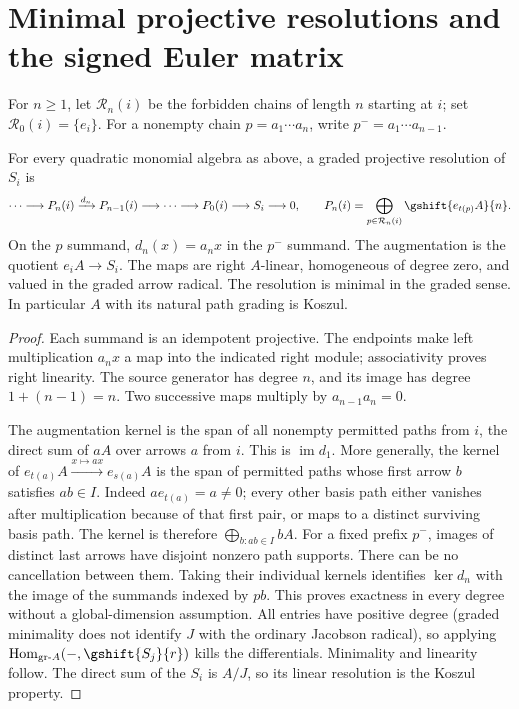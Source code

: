 \section{Minimal projective resolutions and the signed Euler matrix}
For $n\geq1$, let $\mathcal R_n(i)$ be the forbidden chains of length $n$ starting at $i$; set $\mathcal R_0(i)=\{e_i\}$. For a nonempty chain $p=a_1\cdots a_n$, write $p^-=a_1\cdots a_{n-1}$.
\begin{theorem}\label{thm:resolution}
For every quadratic monomial algebra as above, a graded projective resolution of $S_i$ is
\[
 \cdots\longrightarrow P_n(i)\xrightarrow{d_n}P_{n-1}(i)
 \longrightarrow\cdots\longrightarrow P_0(i)\longrightarrow S_i\longrightarrow0,
 \qquad P_n(i)=\bigoplus_{p\in\mathcal R_n(i)} \gshift{e_{t(p)}A}{n}.
\]
On the $p$ summand, $d_n(x)=a_nx$ in the $p^-$ summand. The augmentation is the quotient $e_iA\to S_i$. The maps are right $A$-linear, homogeneous of degree zero, and valued in the graded arrow radical. The resolution is minimal in the graded sense. In particular $A$ with its natural path grading is Koszul.
\end{theorem}
\begin{proof}
Each summand is an idempotent projective. The endpoints make left multiplication $a_nx$ a map into the indicated right module; associativity proves right linearity. The source generator has degree $n$, and its image has degree $1+(n-1)=n$. Two successive maps multiply by $a_{n-1}a_n=0$.

The augmentation kernel is the span of all nonempty permitted paths from $i$, the direct sum of $aA$ over arrows $a$ from $i$. This is $\operatorname{im}d_1$. More generally, the kernel of $e_{t(a)}A\xrightarrow{x\mapsto ax}e_{s(a)}A$ is the span of permitted paths whose first arrow $b$ satisfies $ab\in I$. Indeed $ae_{t(a)}=a\ne0$; every other basis path either vanishes after multiplication because of that first pair, or maps to a distinct surviving basis path. The kernel is therefore $\bigoplus_{b:ab\in I}bA$. For a fixed prefix $p^-$, images of distinct last arrows have disjoint nonzero path supports. There can be no cancellation between them. Taking their individual kernels identifies $\ker d_n$ with the image of the summands indexed by $pb$. This proves exactness in every degree without a global-dimension assumption. All entries have positive degree (graded minimality does not identify $J$ with the ordinary Jacobson radical), so applying $\operatorname{Hom}_{\mathrm{gr}\text{-}A}(-,\gshift{S_j}{r})$ kills the differentials. Minimality and linearity follow. The direct sum of the $S_i$ is $A/J$, so its linear resolution is the Koszul property.
\end{proof}

